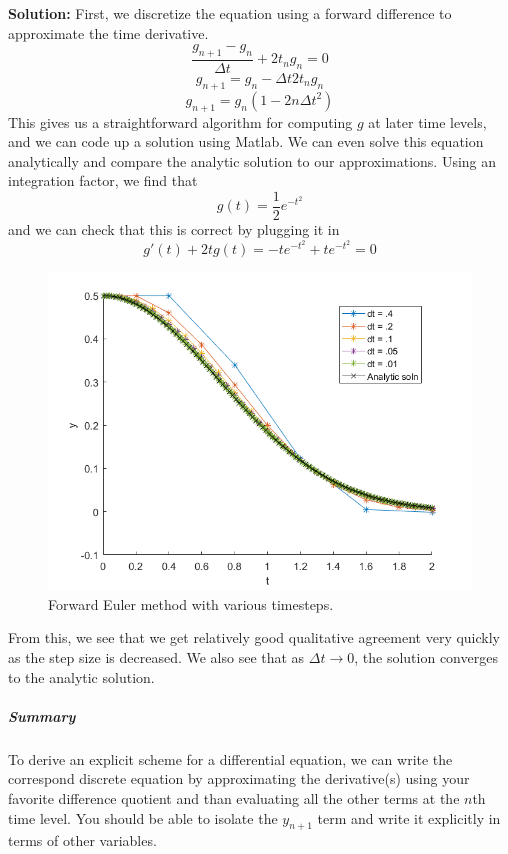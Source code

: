 \documentclass[]{article}
\theoremstyle{definition}
\numberwithin{equation}{section}
\begin{document}
	\textbf{Solution:} First, we discretize the equation using a forward difference to approximate the time derivative.
	\begin{equation*}
	\frac{g_{n+1} - g_n}{\Delta t} + 2t_ng_n = 0
	\end{equation*}
	\begin{equation*}
	g_{n+1} = g_n - \Delta t 2 t_ng_n
	\end{equation*}
	\begin{equation*}
	g_{n+1} = g_n (1- 2n\Delta t^2 )
	\end{equation*}
	This gives us a straightforward algorithm for computing $g$ at later time levels, and we can code up a solution using Matlab. We can even solve this equation analytically and compare the analytic solution to our approximations. Using an integration factor, we find that
	\begin{equation*}
	g(t) = \frac{1}{2}e^{-t^2} 
	\end{equation*}
	and we can check that this is correct by plugging it in
	\begin{equation*}
	g'(t) + 2tg(t) = -te^{-t^2} + te^{-t^2} = 0
	\end{equation*}
	\begin{figure}[H]
		\includegraphics[scale=1]{2_1fig.png}
		\caption{Forward Euler method with various timesteps.}
	\end{figure}
	From this, we see that we get relatively good qualitative agreement very quickly as the step size is decreased. We also see that as $\Delta t \to 0$, the solution converges to the analytic solution.
	\subparagraph{Summary} To derive an explicit scheme for a differential equation, we can write the correspond discrete equation by approximating the derivative(s) using your favorite difference quotient and than evaluating all the other terms at the $n$th time level. You should be able to isolate the $y_{n+1}$ term and write it explicitly in terms of other variables.
\end{document}
